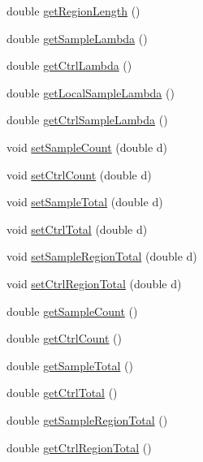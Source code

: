 \begin{DoxyCompactItemize}
\item 
double \hyperlink{classumms_1_1core_1_1model_1_1score_1_1_poisson_enrichment_score_a4374b417b6f63a0a0f43a5632cf579f3}{get\+Region\+Length} ()
\item 
double \hyperlink{classumms_1_1core_1_1model_1_1score_1_1_poisson_enrichment_score_a0c84aab1e90ecb51a6cbb37bc64b71cc}{get\+Sample\+Lambda} ()
\item 
double \hyperlink{classumms_1_1core_1_1model_1_1score_1_1_poisson_enrichment_score_a1f99a2a5be0260419cfe1ded10e40edb}{get\+Ctrl\+Lambda} ()
\item 
double \hyperlink{classumms_1_1core_1_1model_1_1score_1_1_poisson_enrichment_score_a655ac97fedec41bafae2d527cda19766}{get\+Local\+Sample\+Lambda} ()
\item 
double \hyperlink{classumms_1_1core_1_1model_1_1score_1_1_poisson_enrichment_score_a1dcb31681e206ca571e6b6c7339f5768}{get\+Ctrl\+Sample\+Lambda} ()
\item 
void \hyperlink{classumms_1_1core_1_1model_1_1score_1_1_poisson_enrichment_score_af40c845e00a0e3e7d56960533d4478c3}{set\+Sample\+Count} (double d)
\item 
void \hyperlink{classumms_1_1core_1_1model_1_1score_1_1_poisson_enrichment_score_a76b7fff9ad89f7581f9ac6c5509c68cb}{set\+Ctrl\+Count} (double d)
\item 
void \hyperlink{classumms_1_1core_1_1model_1_1score_1_1_poisson_enrichment_score_a750d11633f6f5e66173d1ff2bd249362}{set\+Sample\+Total} (double d)
\item 
void \hyperlink{classumms_1_1core_1_1model_1_1score_1_1_poisson_enrichment_score_a01db0cad7930b22e14f9ee0cef5cca89}{set\+Ctrl\+Total} (double d)
\item 
void \hyperlink{classumms_1_1core_1_1model_1_1score_1_1_poisson_enrichment_score_ad2783636cbac0d5e6d134c08046f8887}{set\+Sample\+Region\+Total} (double d)
\item 
void \hyperlink{classumms_1_1core_1_1model_1_1score_1_1_poisson_enrichment_score_a8aff1d02744276269cfed072337fddc1}{set\+Ctrl\+Region\+Total} (double d)
\item 
double \hyperlink{classumms_1_1core_1_1model_1_1score_1_1_poisson_enrichment_score_a2ac79b7c4d121adf4abb4dde5fce19e8}{get\+Sample\+Count} ()
\item 
double \hyperlink{classumms_1_1core_1_1model_1_1score_1_1_poisson_enrichment_score_ab066acb3478a9f7a5069261e0d846589}{get\+Ctrl\+Count} ()
\item 
double \hyperlink{classumms_1_1core_1_1model_1_1score_1_1_poisson_enrichment_score_a957d28b38461eee75b99a6228d24a966}{get\+Sample\+Total} ()
\item 
double \hyperlink{classumms_1_1core_1_1model_1_1score_1_1_poisson_enrichment_score_a449a683166290cdd7054bad530407855}{get\+Ctrl\+Total} ()
\item 
double \hyperlink{classumms_1_1core_1_1model_1_1score_1_1_poisson_enrichment_score_a301a50635af5074544e263e7eecd05bc}{get\+Sample\+Region\+Total} ()
\item 
double \hyperlink{classumms_1_1core_1_1model_1_1score_1_1_poisson_enrichment_score_a0f66687c8022fb1211135f109cf7867e}{get\+Ctrl\+Region\+Total} ()
\end{DoxyCompactItemize}
